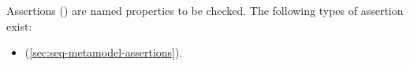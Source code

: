 
Assertions (\massertion) are named properties to be checked.  The following
types of assertion exist:

\begin{itemize}
\item \msequenceproperty{} (\cref{sec:seq-metamodel-assertions}).
\end{itemize}


